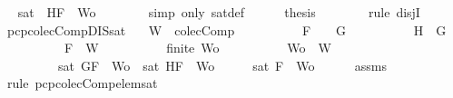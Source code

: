 \begin{isabellebody}
\ \isamarkupfalse%
\ {\isachardoublequoteopen}sat\ {\isacharparenleft}{\isacharbraceleft}\isactrlbold {\isasymnot}\ H{\isacharcomma}F{\isacharbraceright}\ {\isasymunion}\ Wo{\isacharparenright}{\isachardoublequoteclose}\isanewline
\ \ \ \ \ \ \isamarkupfalse%
\ {\isacharparenleft}simp\ only{\isacharcolon}\ sat{\isacharunderscore}def{\isacharparenright}\isanewline
\ \ \ \ \isamarkupfalse%
\ {\isacharquery}thesis\isanewline
\ \ \ \ \ \ \isamarkupfalse%
\ {\isacharparenleft}rule\ disjI{}{\isacharparenright}\isanewline
\ \ \isamarkupfalse%
\isanewline
{}\isamarkupfalse%
%
\endisatagproof
{\isafoldproof}%
%
\isadelimproof
\isanewline
%
\endisadelimproof
\isanewline
{}\isamarkupfalse%
\ pcp{\isacharunderscore}colecComp{\isacharunderscore}DIS{\isacharunderscore}sat{}{\isacharcolon}\isanewline
\ \ \ {\isachardoublequoteopen}W\ {\isasymin}\ colecComp{\isachardoublequoteclose}\isanewline
\ \ \ \ \ \ \ \ \ \ {\isachardoublequoteopen}F\ {\isacharequal}\ \isactrlbold {\isasymnot}\ {\isacharparenleft}\isactrlbold {\isasymnot}\ G{\isacharparenright}{\isachardoublequoteclose}\isanewline
\ \ \ \ \ \ \ \ \ \ {\isachardoublequoteopen}H\ {\isacharequal}\ G{\isachardoublequoteclose}\isanewline
\ \ \ \ \ \ \ \ \ \ {\isachardoublequoteopen}F\ {\isasymin}\ W{\isachardoublequoteclose}\isanewline
\ \ \ \ \ \ \ \ \ \ {\isachardoublequoteopen}finite\ Wo{\isachardoublequoteclose}\isanewline
\ \ \ \ \ \ \ \ \ \ {\isachardoublequoteopen}Wo\ {\isasymsubseteq}\ W{\isachardoublequoteclose}\isanewline
\ \ \ \ \ \ \ \ \ {\isachardoublequoteopen}sat\ {\isacharparenleft}{\isacharbraceleft}G{\isacharcomma}F{\isacharbraceright}\ {\isasymunion}\ Wo{\isacharparenright}\ {\isasymor}\ sat\ {\isacharparenleft}{\isacharbraceleft}H{\isacharcomma}F{\isacharbraceright}\ {\isasymunion}\ Wo{\isacharparenright}{\isachardoublequoteclose}\isanewline
%
\isadelimproof
%
\endisadelimproof
%
\isatagproof
{}\isamarkupfalse%
\ {\isacharminus}\isanewline
\ \ \isamarkupfalse%
\ {\isachardoublequoteopen}sat\ {\isacharparenleft}{\isacharbraceleft}F{\isacharbraceright}\ {\isasymunion}\ Wo{\isacharparenright}{\isachardoublequoteclose}\isanewline
\ \ \ \ \isamarkupfalse%
\ assms{\isacharparenleft}{}{\isacharcomma}{}{\isacharcomma}{}{\isacharcomma}{}{\isacharparenright}\ \isamarkupfalse%
\ {\isacharparenleft}rule\ pcp{\isacharunderscore}colecComp{\isacharunderscore}elem{\isacharunderscore}sat{\isacharparenright}\isanewline

\end{isabellebody}
